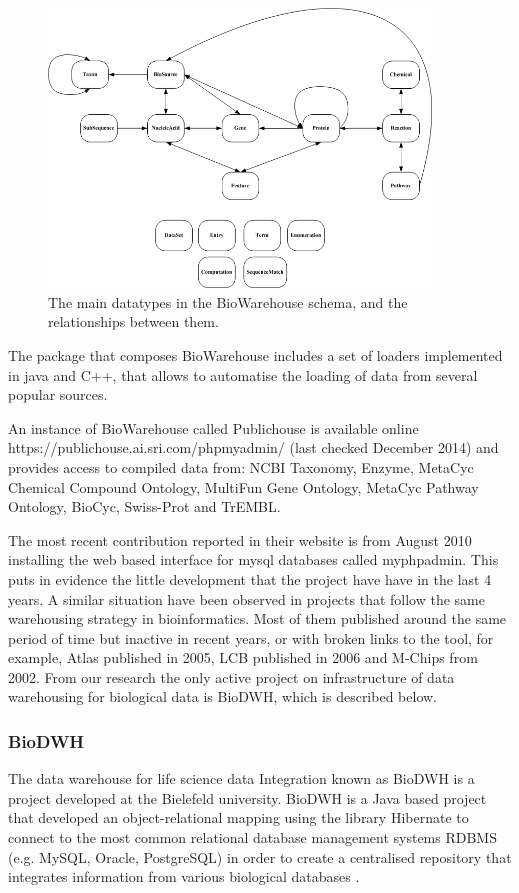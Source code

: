 \begin{figure}  
\includegraphics[width=4in]{figures/biowarehouse.png}
\caption[Original BioWarehouse schema.]{The main datatypes in the BioWarehouse schema, and the relationships between them.
\label{fig:biowarehouse}}
\end{figure}

The package that composes BioWarehouse includes a set of loaders implemented in java and C++, that allows to automatise the loading of data from several popular sources. 

An instance of BioWarehouse called Publichouse is available online https://publichouse.ai.sri.com/phpmyadmin/ (last checked December 2014) and provides access to compiled data from: NCBI Taxonomy, Enzyme, MetaCyc Chemical Compound Ontology, MultiFun Gene Ontology, MetaCyc Pathway Ontology, BioCyc, Swiss-Prot and TrEMBL.

The most recent contribution reported in their website is from August 2010 installing the web based interface for mysql databases called myphpadmin. This puts in evidence the little development that the project have have in the last 4 years. A similar situation have been observed in projects that follow the same warehousing strategy in bioinformatics. Most of them published around the same period of time but inactive in recent years, or with broken links to the tool, for example, Atlas \cite{SHA2005} published in 2005, LCB\cite{AME2006} published in 2006 and M-Chips \cite{FEL2002} from 2002. From our research the only active project on infrastructure of data warehousing for biological data is BioDWH, which is described below.

\subsubsection{BioDWH}
The data warehouse for life science data Integration known as BioDWH is a project developed at  the Bielefeld university. BioDWH is a Java based project that developed an object-relational mapping using the library Hibernate to connect to the most common relational database management systems RDBMS (e.g. MySQL, Oracle, PostgreSQL) in order to create a centralised repository that integrates information from various biological databases \cite{TOP2008}.

